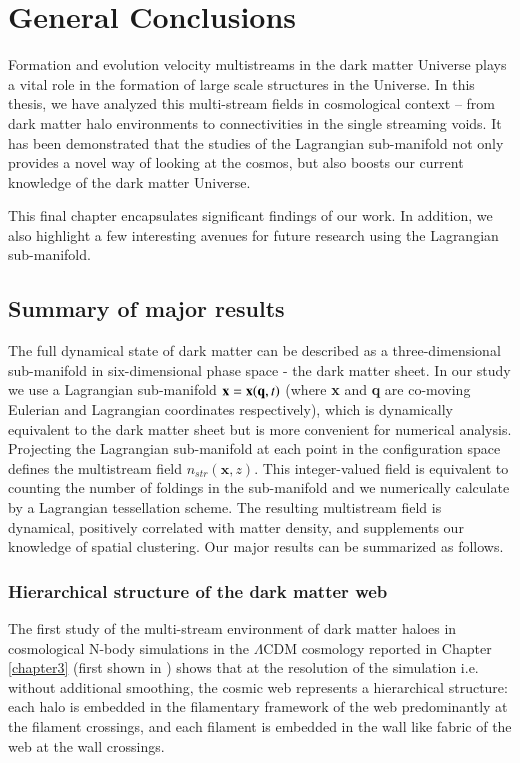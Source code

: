 
\chapter{General Conclusions}\label{chapter6}

Formation and evolution velocity multistreams in the dark matter Universe plays a vital role in the formation of large scale structures in the Universe. In this thesis, we have analyzed this multi-stream fields in cosmological context -- from dark matter halo environments to connectivities in the single streaming voids. It has been demonstrated that the studies of the Lagrangian sub-manifold not only provides a novel way of looking at the cosmos, but also boosts our current knowledge of the dark matter Universe. 

This final chapter encapsulates significant findings of our work. In addition, we also highlight a few interesting avenues for future research using the Lagrangian sub-manifold.      

\section{Summary of major results}

The full dynamical state of  dark matter can be described as a three-dimensional sub-manifold
in six-dimensional phase space - the dark matter sheet. In our study we use a Lagrangian sub-manifold ${\bf x} = {\bf x}({\bf q},t)$ 
(where {\bf x} and {\bf q} are co-moving Eulerian and Lagrangian coordinates respectively), which 
is dynamically  equivalent to the dark matter sheet but is more convenient for numerical analysis. Projecting the Lagrangian sub-manifold at each point in the configuration space defines the multistream field  $n_{str}(\mathbf{x}, z)$. This integer-valued field is equivalent to counting the number of foldings in the sub-manifold and we numerically calculate by a Lagrangian tessellation scheme. The resulting multistream field is dynamical, positively correlated with matter density, and supplements our knowledge of spatial clustering. Our major results can be summarized as follows.

\subsection{Hierarchical structure of the dark matter web}

The first study of the multi-stream environment of dark matter haloes in cosmological N-body simulations in the $\Lambda$CDM cosmology reported in Chapter \ref{chapter3} (first shown in \cite{Ramachandra2015}) shows that at the resolution of the simulation i.e. without additional smoothing, the cosmic web represents a hierarchical structure: each halo is embedded in the filamentary framework of the web predominantly  at the filament crossings, and each filament is embedded in the wall like fabric of the web at the wall crossings. 

